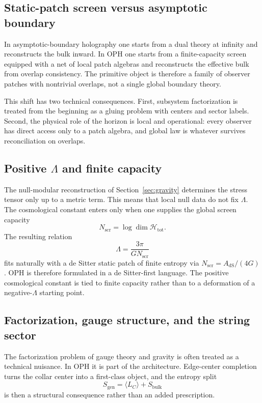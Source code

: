 \documentclass[11pt]{article}
\begin{document}
\subsection{Static-patch screen versus asymptotic boundary}

In asymptotic-boundary holography one starts from a dual theory at infinity and reconstructs the bulk inward. In OPH one starts from a finite-capacity screen equipped with a net of local patch algebras and reconstructs the effective bulk from overlap consistency. The primitive object is therefore a family of observer patches with nontrivial overlaps, not a single global boundary theory.

This shift has two technical consequences. First, subsystem factorization is treated from the beginning as a gluing problem with centers and sector labels. Second, the physical role of the horizon is local and operational: every observer has direct access only to a patch algebra, and global law is whatever survives reconciliation on overlaps.

\subsection{Positive $\Lambda$ and finite capacity}

The null-modular reconstruction of Section~\ref{sec:gravity} determines the stress tensor only up to a metric term. This means that local null data do not fix $\Lambda$. The cosmological constant enters only when one supplies the global screen capacity
\[
N_{\mathrm{scr}}=\log\dim\mathcal H_{\mathrm{tot}}.
\]
The resulting relation
\[
\Lambda=\frac{3\pi}{G N_{\mathrm{scr}}}
\]
fits naturally with a de Sitter static patch of finite entropy via $N_{\mathrm{scr}}=A_{\mathrm{dS}}/(4G)$. OPH is therefore formulated in a de Sitter-first language. The positive cosmological constant is tied to finite capacity rather than to a deformation of a negative-$\Lambda$ starting point.

\subsection{Factorization, gauge structure, and the string sector}

The factorization problem of gauge theory and gravity is often treated as a technical nuisance. In OPH it is part of the architecture. Edge-center completion turns the collar center into a first-class object, and the entropy split
\[
S_{\mathrm{gen}}=\langle L_C\rangle + S_{\mathrm{bulk}}
\]
is then a structural consequence rather than an added prescription.
\end{document}
